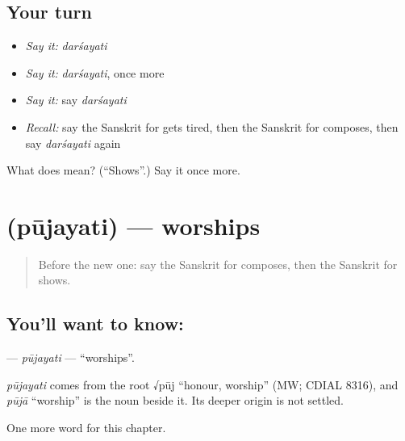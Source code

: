 \subsection*{Your turn}
\begin{itemize}
\raggedright
  \item \emph{Say it:} \emph{darśayati}
  \item \emph{Say it:} \emph{darśayati}, once more
  \item \emph{Say it:} say \emph{darśayati}
  \item \emph{Recall:} say the Sanskrit for gets tired, then the Sanskrit for composes, then say \emph{darśayati} again
\end{itemize}

\begin{tcolorbox}[breakable,colback=teal!4,colframe=teal!35!black,title={Before you move on}]
What does  mean? (\textquotedblleft{}Shows\textquotedblright{}.) Say it once more.
\end{tcolorbox}
\section[\texorpdfstring{\sk{पूजयति} (pūjayati)}{पूजयति (pūjayati)}]{ (pūjayati) — worships}

\label{lesson:SA-C142-pujayati}



\begin{quote}
Before the new one: say the Sanskrit for composes, then the Sanskrit for shows.
\end{quote}

\subsection*{You'll want to know: }
\textbf{} — \emph{pūjayati} — \textquotedblleft{}worships\textquotedblright{}.

\begin{cousinweb}
\emph{pūjayati} comes from the root √pūj \textquotedblleft{}honour, worship\textquotedblright{} (MW; CDIAL 8316), and \emph{pūjā} \textquotedblleft{}worship\textquotedblright{} is the noun beside it. Its deeper origin is not settled.
\end{cousinweb}

\begin{grammarlens}[title={What you've built}]
One more word for this chapter.
\end{grammarlens}

